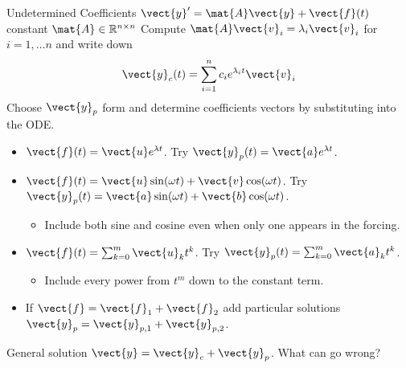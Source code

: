 \begin{frame}{Undetermined Coefficients \quad $\vect{y}'=\mat{A}\vect{y}+\vect{f}(t)$ \quad constant $\mat{A}\in\mathbb{R}^{n\times n}$}
\small
\setlength{\abovedisplayskip}{2pt}
\setlength{\belowdisplayskip}{2pt}
Compute $\mat{A}\vect{v}_i=\lambda_i\vect{v}_i$ for $i=1,\dots n$ and write down
\[
  \vect{y}_c(t)=\sum_{i=1}^n c_i e^{\lambda_i t}\vect{v}_i
\]
Choose $\vect{y}_p$ form and determine coefficients vectors by
substituting into the ODE.
\begin{itemize}
\setlength{\itemsep}{4pt}
  \item {}
  $\vect{f}(t)=\vect{u}e^{\lambda t}$.
  Try $\vect{y}_p(t)=\vect{a}e^{\lambda t}$.
  \item {}
  $\vect{f}(t)=\vect{u}\sin(\omega t)+\vect{v}\cos(\omega t)$.
  Try $\vect{y}_p(t)=\vect{a}\sin(\omega t)+\vect{b}\cos(\omega t)$.
  \begin{itemize}
    \item Include both sine and cosine even when only one appears in the forcing.
  \end{itemize}
  \item {}
  $\vect{f}(t)=\sum_{k=0}^{m}\vect{u}_k t^k$.
  Try $\vect{y}_p(t)=\sum_{k=0}^{m}\vect{a}_k t^k$.
  \begin{itemize}
    \item Include every power from $t^m$ down to the constant term.
  \end{itemize}
  \item {}
  If $\vect{f}=\vect{f}_1+\vect{f}_2$ add particular solutions
  $\vect{y}_p=\vect{y}_{p,1}+\vect{y}_{p,2}$.
\end{itemize}
General solution $\vect{y}=\vect{y}_c+\vect{y}_p$.  What can go wrong?
\end{frame}
